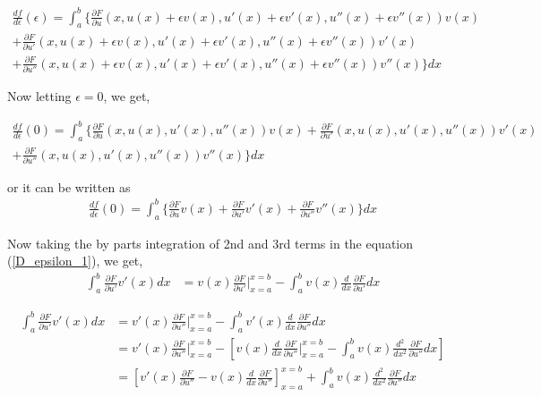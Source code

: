 \begin{align}
    \frac{df}{d\epsilon}(\epsilon) = \int_{a}^{b} \Bigg\{  \frac{\partial F}{\partial u}(x,u(x)+\epsilon v(x),u'(x)+\epsilon v'(x),u''(x)+\epsilon v''(x))v(x) \nonumber \\
     + \frac{\partial F}{\partial u'}(x,u(x)+\epsilon v(x),u'(x)+\epsilon v'(x),u''(x)+\epsilon v''(x))v'(x) \nonumber \\
    + \frac{\partial F}{\partial u''}(x,u(x)+\epsilon v(x),u'(x)+\epsilon v'(x),u''(x)+\epsilon v''(x))v''(x)   \Bigg\} dx
\end{align}

\noindent Now letting $\epsilon = 0$, we get,

\begin{align}
    \frac{df}{d\epsilon}(0) = \int_{a}^{b} \Bigg\{  \frac{\partial F}{\partial u}(x,u(x),u'(x),u''(x))v(x) + \frac{\partial F}{\partial u'}(x,u(x),u'(x),u''(x))v'(x)\nonumber \\+ \frac{\partial F}{\partial u''}(x,u(x),u'(x),u''(x))v''(x)   \Bigg\} dx
\end{align}

\noindent or it can be written as
\begin{align}\label{D_epsilon_1}
    \frac{df}{d\epsilon}(0) = \int_{a}^{b} \Bigg\{  \frac{\partial F}{\partial u}v(x) + \frac{\partial F}{\partial u'}v'(x)+ \frac{\partial F}{\partial u''}v''(x)   \Bigg\} dx
\end{align}

\noindent Now taking the by parts integration of 2nd and 3rd terms in the equation (\ref{D_epsilon_1}), we get,
\begin{align}\label{P1term_2_1}
    \int_{a}^{b} \frac{\partial F}{\partial u'}v'(x)dx &= v(x) \frac{\partial F}{\partial u'} \Biggr|_{x=a}^{x=b}  - \int_{a}^{b} v(x) \frac{d}{dx} \frac{\partial F}{\partial u'}dx
\end{align}

\begin{align}\label{P1term_3_1}
    \int_{a}^{b} \frac{\partial F}{\partial u'}v'(x)dx &= v'(x) \frac{\partial F}{\partial u''}\Biggr|_{x=a}^{x=b} - \int_{a}^{b} v'(x) \frac{d}{dx} \frac{\partial F}{\partial u''}dx\nonumber\\
    &= v'(x) \frac{\partial F}{\partial u''}\Biggr|_{x=a}^{x=b} -\left [ v(x) \frac{d}{dx}\frac{\partial F}{\partial u''}\Biggr|_{x=a}^{x=b} - \int_{a}^{b} v(x) \frac{d^2}{dx^2} \frac{\partial F}{\partial u''}dx\right]\nonumber\\
    &=\left [ v'(x) \frac{\partial F}{\partial u''} - v(x) \frac{d}{dx}\frac{\partial F}{\partial u''}\right ]_{x=a}^{x=b} + \int_{a}^{b} v(x) \frac{d^2}{dx^2} \frac{\partial F}{\partial u''}dx
\end{align}


